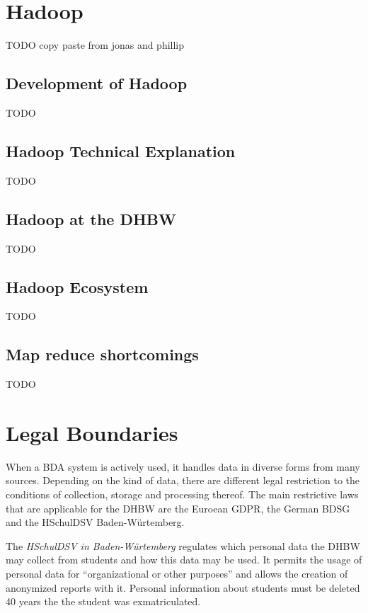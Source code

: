 \section{Hadoop}

TODO copy paste from jonas and phillip

\subsection{Development of Hadoop}

TODO

\subsection{Hadoop Technical Explanation}

TODO

\subsection{Hadoop at the DHBW}

TODO

\subsection{Hadoop Ecosystem}

TODO

\subsection{Map reduce shortcomings}

TODO


\section{Legal Boundaries}

When a \ac{BDA} system is actively used, it handles data in diverse forms from many sources.
Depending on the kind of data, there are different legal restriction 
to the conditions of collection, storage and processing thereof.
The main restrictive laws that are applicable for the \ac{DHBW} are the Euroean \ac{GDPR}, the German \ac{BDSG} and the \ac{HSchulDSV} Baden-Würtemberg.

The \emph{\ac{HSchulDSV} in Baden-Würtemberg}  regulates which personal data the \ac{DHBW} may collect from students and how this data may be used.
It permits the usage of personal data for \enquote{organizational or other purposes} and allows the creation of anonymized reports with it.
Personal information about students must be deleted 40 years the the student was exmatriculated. 
\autocite[][§1, §11, §12]{bw2012hcchuldsv}


